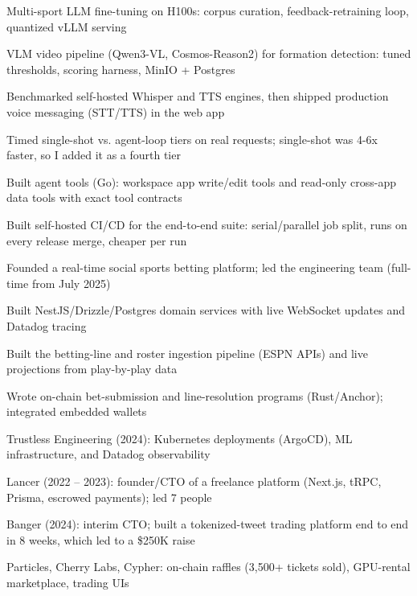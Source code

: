\documentclass[print]{jack-resume}
\begin{document}
\begin{tightemize}
    \item Multi-sport LLM fine-tuning on H100s: corpus curation, feedback-retraining loop, quantized vLLM serving
    \item VLM video pipeline (Qwen3-VL, Cosmos-Reason2) for formation detection: tuned thresholds, scoring harness, MinIO + Postgres
    \item Benchmarked self-hosted Whisper and TTS engines, then shipped production voice messaging (STT/TTS) in the web app
    \item Timed single-shot vs. agent-loop tiers on real requests; single-shot was 4-6x faster, so I added it as a fourth tier
    \item Built agent tools (Go): workspace app write/edit tools and read-only cross-app data tools with exact tool contracts
    \item Built self-hosted CI/CD for the end-to-end suite: serial/parallel job split, runs on every release merge, cheaper per run
\end{tightemize}
\sectionsep

\begin{tightemize}
    \item Founded a real-time social sports betting platform; led the engineering team (full-time from July 2025)
    \item Built NestJS/Drizzle/Postgres domain services with live WebSocket updates and Datadog tracing
    \item Built the betting-line and roster ingestion pipeline (ESPN APIs) and live projections from play-by-play data
    \item Wrote on-chain bet-submission and line-resolution programs (Rust/Anchor); integrated embedded wallets
\end{tightemize}
\sectionsep

\begin{tightemize}
    \item Trustless Engineering (2024): Kubernetes deployments (ArgoCD), ML infrastructure, and Datadog observability
    \item Lancer (2022 – 2023): founder/CTO of a freelance platform (Next.js, tRPC, Prisma, escrowed payments); led 7 people
    \item Banger (2024): interim CTO; built a tokenized-tweet trading platform end to end in 8 weeks, which led to a \$250K raise
    \item Particles, Cherry Labs, Cypher: on-chain raffles (3,500+ tickets sold), GPU-rental marketplace, trading UIs
\end{tightemize}
\sectionsep
\end{document}
